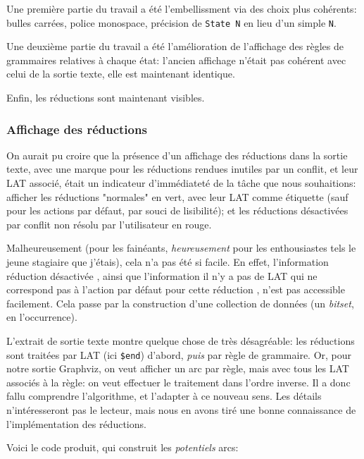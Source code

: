 \documentclass[a4paper,11pt,twoside,final]{article}
\begin{document}
  Une première partie du travail a été l'embellissment via des choix plus
  cohérents: bulles carrées, police monospace, précision de \texttt{State N} en
  lieu d'un simple \texttt{N}.

  Une deuxième partie du travail a été l'amélioration de l'affichage des règles
  de grammaires relatives à chaque état: l'ancien affichage n'était pas
  cohérent avec celui de la sortie texte, elle est maintenant identique.

  Enfin, les réductions sont maintenant visibles.

  \subsubsection{Affichage des réductions}

  On aurait pu croire que la présence d'un affichage des réductions dans la
  sortie texte, avec une marque pour les réductions rendues inutiles par un
  conflit, et leur LAT associé, était un indicateur d'immédiateté de la tâche
  que nous souhaitions: afficher les réductions "normales" en vert, avec leur
  LAT comme étiquette (sauf pour les actions par défaut, par souci de
  lisibilité); et les réductions désactivées par conflit non résolu par
  l'utilisateur en rouge.

  Malheureusement (pour les fainéants, \textit{heureusement} pour les
  enthousiastes tels le jeune stagiaire que j'étais), cela n'a pas été si
  facile. En effet, l'information \og réduction désactivée \fg, ainsi que
  l'information \og il n'y a pas de LAT qui ne correspond pas à l'action par
  défaut pour cette réduction \fg, n'est pas accessible facilement. Cela passe
  par la construction d'une collection de données (un \textit{bitset}, en
  l'occurrence).

  L'extrait de sortie texte montre quelque chose de très désagréable: les
  réductions sont traitées par LAT (ici \texttt{\$end}) d'abord, \textit{puis}
  par règle de grammaire. Or, pour notre sortie Graphviz, on veut afficher un
  arc par règle, mais avec tous les LAT associés à la règle: on veut effectuer
  le traitement dans l'ordre inverse. Il a donc fallu comprendre l'algorithme,
  et l'adapter à ce nouveau sens. Les détails n'intéresseront pas le lecteur,
  mais nous en avons tiré une bonne connaissance de l'implémentation des
  réductions.

  Voici le code produit, qui construit les \textit{potentiels} arcs:
\end{document}
